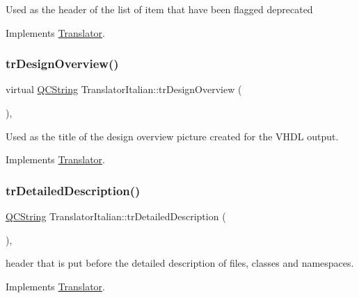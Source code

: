 Used as the header of the list of item that have been flagged deprecated 

Implements \mbox{\hyperlink{class_translator}{Translator}}.

\mbox{\label{class_translator_italian_ad63fde2ac0d62192543ea391a7bc9b3d}} 
\subsubsection{\texorpdfstring{trDesignOverview()}{trDesignOverview()}}
{\footnotesize\ttfamily virtual \mbox{\hyperlink{class_q_c_string}{Q\+C\+String}} Translator\+Italian\+::tr\+Design\+Overview (\begin{DoxyParamCaption}{ }\end{DoxyParamCaption})\hspace{0.3cm}{\ttfamily [inline]}, {\ttfamily [virtual]}}

Used as the title of the design overview picture created for the V\+H\+DL output. 

Implements \mbox{\hyperlink{class_translator}{Translator}}.

\mbox{\label{class_translator_italian_a1b1fe2622428c4613dab5aa77624ff95}} 
\subsubsection{\texorpdfstring{trDetailedDescription()}{trDetailedDescription()}}
{\footnotesize\ttfamily \mbox{\hyperlink{class_q_c_string}{Q\+C\+String}} Translator\+Italian\+::tr\+Detailed\+Description (\begin{DoxyParamCaption}{ }\end{DoxyParamCaption})\hspace{0.3cm}{\ttfamily [inline]}, {\ttfamily [virtual]}}

header that is put before the detailed description of files, classes and namespaces. 

Implements \mbox{\hyperlink{class_translator}{Translator}}.

\mbox{\label{class_translator_italian_ac0e1e2c20e38faf820b45b09e589625f}} 
